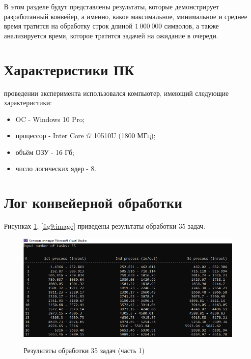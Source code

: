 В этом разделе будут представлены результаты, которые демонстрирует разработанный конвейер, а именно, какое максимальное, минимальное и среднее время тратится на обработку строк длиной $1\:000\:000$ символов, а также анализируется время, которое тратится задачей на ожидание в очереди.

\section{Характеристики ПК}
 проведении эксперимента использовался компьютер, имеющий следующие характеристики:
\begin{itemize}
	\item OC - Windows 10 Pro;
	\item процессор - Inter Core i7 10510U (1800 МГц);
	\item объём ОЗУ - 16 Гб;
	\item число логических ядер - 8.
\end{itemize}

\section{Лог конвейерной обработки}
 Рисунках \ref{fig8:image}, \ref{fig9:image} приведены результаты обработки 35 задач.

\begin{figure}[h]
	\begin{center}
		{\includegraphics[scale = 0.85]{results/result_1_part_1}}
		\caption{Результаты обработки 35 задач (часть 1)}
		\label{fig8:image}
	\end{center}
\end{figure}

